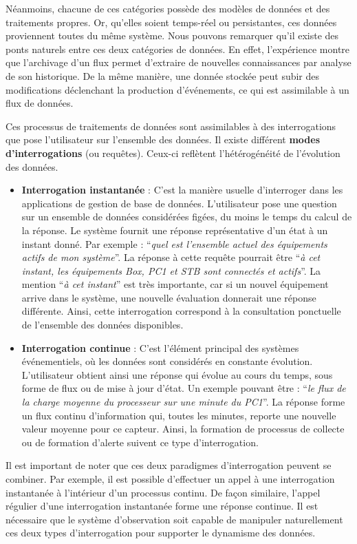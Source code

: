 Néanmoins, chacune de ces catégories possède des modèles de données et des traitements propres. Or, qu'elles soient temps-réel ou persistantes, ces données proviennent toutes du même système. Nous pouvons remarquer qu'il existe des ponts naturels entre ces deux catégories de données. En effet, l'expérience montre que l'archivage d'un flux permet d'extraire de nouvelles connaissances par analyse de son historique. De la même manière, une donnée stockée peut subir des modifications déclenchant la production d'événements, ce qui est assimilable à un flux de données.

Ces processus de traitements de données sont assimilables à des interrogations que pose l'utilisateur sur l'ensemble des données. Il existe différent \textbf{modes d'interrogations} (ou requêtes). Ceux-ci reflètent l'hétérogénéité de l'évolution des données.
\begin{itemize}
    \item \textbf{Interrogation instantanée} : C'est la manière usuelle d'interroger dans les applications de gestion de base de données. L'utilisateur pose une question sur un ensemble de données considérées figées, du moins le temps du calcul de la réponse. Le système fournit une réponse représentative d'un état à un instant donné. Par exemple : \enquote{\it quel est l'ensemble actuel des équipements actifs de mon système}. La réponse à cette requête pourrait être \enquote{\it à cet instant, les équipements Box, PC1 et STB sont connectés et actifs}. La mention \enquote{\it à cet instant} est très importante, car si un nouvel équipement arrive dans le système, une nouvelle évaluation donnerait une réponse différente. Ainsi, cette interrogation correspond à la consultation ponctuelle de l'ensemble des données disponibles.
    \item \textbf{Interrogation continue} : C'est l'élément principal des systèmes événementiels, où les données sont considérés en constante évolution. L'utilisateur obtient ainsi une réponse qui évolue au cours du temps, sous forme de flux ou de mise à jour d'état. Un exemple pouvant être : \enquote{\it le flux de la charge moyenne du processeur sur une minute du PC1}. La réponse forme un flux continu d'information qui, toutes les minutes, reporte une nouvelle valeur moyenne pour ce capteur. Ainsi, la formation de processus de collecte ou de formation d'alerte suivent ce type d'interrogation.
\end{itemize}

Il est important de noter que ces deux paradigmes d'interrogation peuvent se combiner. Par exemple, il est possible d'effectuer un appel à une interrogation instantanée à l'intérieur d'un processus continu. De façon similaire, l'appel régulier d'une interrogation instantanée forme une réponse continue. Il est nécessaire que le système d'observation soit capable de manipuler naturellement ces deux types d'interrogation pour supporter le dynamisme des données.


